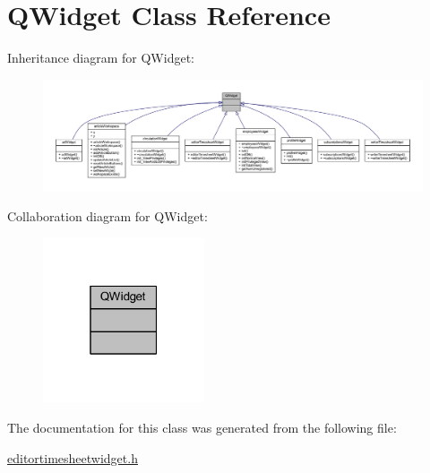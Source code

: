 \hypertarget{class_q_widget}{}\section{Q\+Widget Class Reference}
\label{class_q_widget}


Inheritance diagram for Q\+Widget\+:
\nopagebreak
\begin{figure}[H]
\begin{center}
\leavevmode
\includegraphics[width=350pt]{class_q_widget__inherit__graph}
\end{center}
\end{figure}


Collaboration diagram for Q\+Widget\+:
\nopagebreak
\begin{figure}[H]
\begin{center}
\leavevmode
\includegraphics[width=135pt]{class_q_widget__coll__graph}
\end{center}
\end{figure}


The documentation for this class was generated from the following file\+:\begin{DoxyCompactItemize}
\item 
\hyperlink{editortimesheetwidget_8h}{editortimesheetwidget.\+h}\end{DoxyCompactItemize}
